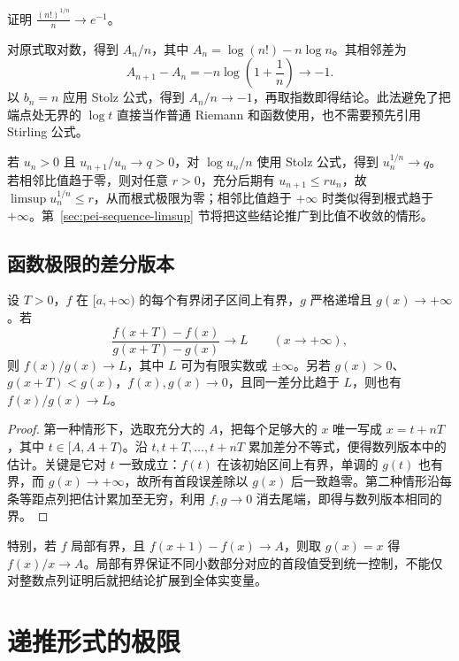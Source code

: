\begin{example}
\label{ex:pei-factorial-root}
证明 $\displaystyle\frac{(n!)^{1/n}}n\to e^{-1}$。
\end{example}
\begin{solve}
对原式取对数，得到 $A_n/n$，其中 $A_n=\log(n!)-n\log n$。其相邻差为
\[
    A_{n+1}-A_n=-n\log\left(1+\frac1n\right)\longrightarrow-1.
\]
以 $b_n=n$ 应用 Stolz 公式，得到 $A_n/n\to-1$，再取指数即得结论。此法避免了把端点处无界的 $\log t$ 直接当作普通 Riemann 和函数使用，也不需要预先引用 Stirling 公式。
\end{solve}

若 $u_n>0$ 且 $u_{n+1}/u_n\to q>0$，对 $\log u_n/n$ 使用 Stolz 公式，得到 $u_n^{1/n}\to q$。若相邻比值趋于零，则对任意 $r>0$，充分后期有 $u_{n+1}\le r u_n$，故 $\limsup u_n^{1/n}\le r$，从而根式极限为零；相邻比值趋于 $+\infty$ 时类似得到根式趋于 $+\infty$。第~\ref{sec:pei-sequence-limsup} 节将把这些结论推广到比值不收敛的情形。

\subsection{函数极限的差分版本}

\begin{proposition}
\label{prop:pei-function-stolz}
设 $T>0$，$f$ 在 $[a,+\infty)$ 的每个有界闭子区间上有界，$g$ 严格递增且 $g(x)\to+\infty$。若
\[
    \frac{f(x+T)-f(x)}{g(x+T)-g(x)}\longrightarrow L
    \qquad(x\to+\infty),
\]
则 $f(x)/g(x)\to L$，其中 $L$ 可为有限实数或 $\pm\infty$。另若 $g(x)>0$、$g(x+T)<g(x)$，$f(x),g(x)\to0$，且同一差分比趋于 $L$，则也有 $f(x)/g(x)\to L$。
\end{proposition}
\begin{proof}
第一种情形下，选取充分大的 $A$，把每个足够大的 $x$ 唯一写成 $x=t+nT$，其中 $t\in[A,A+T)$。沿 $t,t+T,\ldots,t+nT$ 累加差分不等式，便得数列版本中的估计。关键是它对 $t$ 一致成立：$f(t)$ 在该初始区间上有界，单调的 $g(t)$ 也有界，而 $g(x)\to+\infty$，故所有首段误差除以 $g(x)$ 后一致趋零。第二种情形沿每条等距点列把估计累加至无穷，利用 $f,g\to0$ 消去尾端，即得与数列版本相同的界。
\end{proof}

特别，若 $f$ 局部有界，且 $f(x+1)-f(x)\to A$，则取 $g(x)=x$ 得 $f(x)/x\to A$。局部有界保证不同小数部分对应的首段值受到统一控制，不能仅对整数点列证明后就把结论扩展到全体实变量。

\section{递推形式的极限}
\label{sec:pei-recursive-limits}


